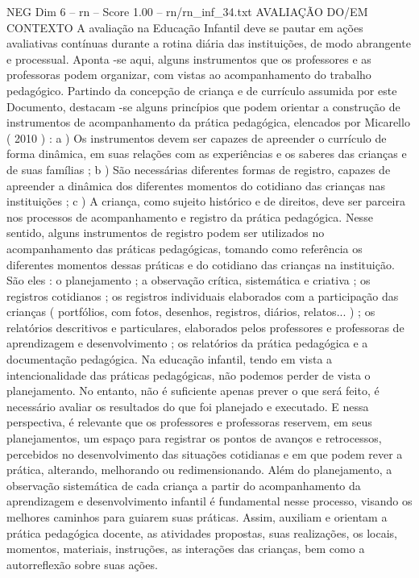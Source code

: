 \begin{textsample}{NEG Dim 6 – rn – Score 1.00 – rn/rn\_inf\_34.txt}  \label{ex:f6_neg_059}
AVALIAÇÃO DO/EM CONTEXTO A avaliação na Educação Infantil deve se pautar em ações avaliativas contínuas durante a rotina diária das instituições, de modo abrangente e processual.
Aponta -se aqui, alguns instrumentos que os professores e as professoras podem organizar, com vistas ao acompanhamento do trabalho pedagógico.
Partindo da concepção de criança e de currículo assumida por este Documento, destacam -se alguns princípios que podem orientar a construção de instrumentos de acompanhamento da prática pedagógica, elencados por Micarello ( 2010 ) : a ) Os instrumentos devem ser capazes de apreender o currículo de forma dinâmica, em suas relações com as experiências e os saberes das crianças e de suas famílias ; b ) São necessárias diferentes formas de registro, capazes de apreender a dinâmica dos diferentes momentos do cotidiano das crianças nas instituições ; c ) A criança, como sujeito histórico e de direitos, deve ser parceira nos processos de acompanhamento e registro da prática pedagógica.
Nesse sentido, alguns instrumentos de registro podem ser utilizados no acompanhamento das práticas pedagógicas, tomando como referência os diferentes momentos dessas práticas e do cotidiano das crianças na instituição.
São eles : o planejamento ; a observação crítica, sistemática e criativa ; os registros cotidianos ; os registros individuais elaborados com a participação das crianças ( portfólios, com fotos, desenhos, registros, diários, relatos... ) ; os relatórios descritivos e particulares, elaborados pelos professores e professoras de aprendizagem e desenvolvimento ; os relatórios da prática pedagógica e a documentação pedagógica.
Na educação infantil, tendo em vista a intencionalidade das práticas pedagógicas, não podemos perder de vista o planejamento.
No entanto, não é suficiente apenas prever o que será feito, é necessário avaliar os resultados do que foi planejado e executado.
E nessa perspectiva, é relevante que os professores e professoras reservem, em seus planejamentos, um espaço para registrar os pontos de avanços e retrocessos, percebidos no desenvolvimento das situações cotidianas e em que podem rever a prática, alterando, melhorando ou redimensionando.
Além do planejamento, a observação sistemática de cada criança a partir do acompanhamento da aprendizagem e desenvolvimento infantil é fundamental nesse processo, visando os melhores caminhos para guiarem suas práticas.
Assim, auxiliam e orientam a prática pedagógica docente, as atividades propostas, suas realizações, os locais, momentos, materiais, instruções, as interações das crianças, bem como a autorreflexão sobre suas ações.

\end{textsample}

